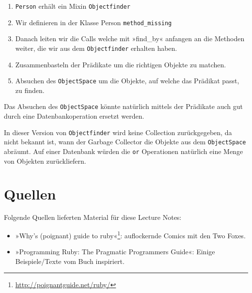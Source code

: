 \documentclass[a4book,11pt,twoside]{scrbook}
\begin{document}
\begin{enumerate}
	\item \texttt{Person} erhält ein Mixin \texttt{Objectfinder}
	\item Wir definieren in der Klasse Person \texttt{method\_missing}
	\item Danach leiten wir die Calls welche mit »find\_by« anfangen an die Methoden weiter, die wir aus dem \texttt{Objectfinder} erhalten haben.
	\item Zusammenbasteln der Prädikate um die richtigen Objekte zu matchen.
	\item Absuchen des \texttt{ObjectSpace} um die Objekte, auf welche das Prädikat passt, zu finden.
\end{enumerate}


Das Absuchen des \texttt{ObjectSpace} könnte natürlich mittels der Prädikate auch gut durch eine Datenbankoperation ersetzt werden.

In dieser Version von \texttt{Objectfinder} wird keine Collection zurückgegeben, da nicht bekannt ist, wann der Garbage Collector die Objekte aus dem \texttt{ObjectSpace} abräumt. Auf einer Datenbank würden die \texttt{or} Operationen natürlich eine Menge von Objekten zurückliefern.




\chapter*{Quellen} %
\label{cha:quellen}
Folgende Quellen lieferten Material für diese Lecture Notes:

\begin{itemize}
	\item »Why's (poignant) guide to ruby«\footnote{\url{http://poignantguide.net/ruby/}}: auflockernde Comics mit den Two Foxes.
	\item »Programming Ruby: The Pragmatic Programmers Guide«: Einige Beispiele/Texte vom Buch inspiriert.
\end{itemize}
\end{document}

